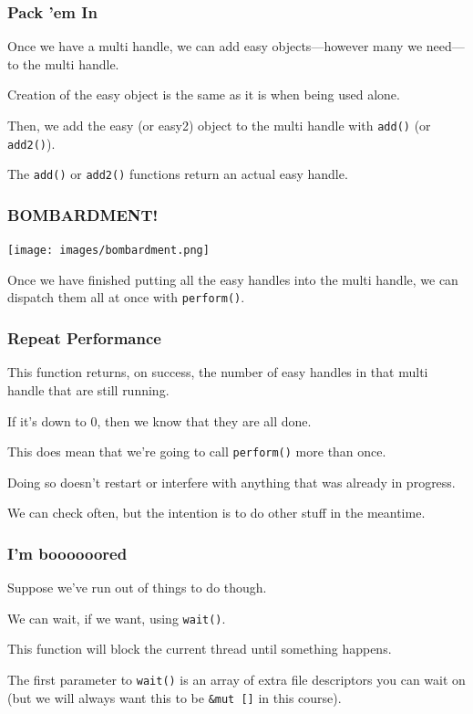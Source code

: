 \begin{frame}
\frametitle{Pack 'em In}

Once we have a multi handle, we can add easy objects---however many we need---to the multi handle. 

Creation of the easy object is the same as it is when being used alone.

Then, we add the easy (or easy2) object to the multi handle with \texttt{add()} (or \texttt{add2()}). 

The \texttt{add()} or \texttt{add2()} functions return an actual easy handle.
\end{frame}


\begin{frame}
\frametitle{BOMBARDMENT!}

\begin{center}
	\texttt{[image: images/bombardment.png]}
\end{center}

Once we have finished putting all the easy handles into the multi handle, we can dispatch them all at once with \texttt{perform()}.

\end{frame}


\begin{frame}
\frametitle{Repeat Performance}

This function returns, on success, the number of easy handles in that multi handle that are still running. 

If it's down to 0, then we know that they are all done.

This does mean that we're going to call \texttt{perform()} more than once. 

Doing so doesn't restart or interfere with anything that was already in progress.

We can check often, but the intention is to do other stuff in the meantime.

\end{frame}



\begin{frame}
\frametitle{I'm boooooored}

Suppose we've run out of things to do though. 

We can wait, if we want, using \texttt{wait()}. 

This function will block the current thread until something happens.

The first parameter to \texttt{wait()} is an array of extra file descriptors you can wait on (but we will always want this to be \texttt{\&mut []} in this course).


\end{frame}


